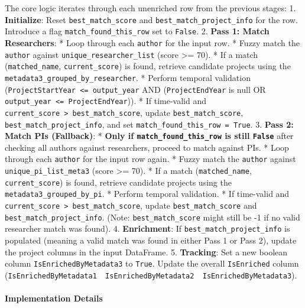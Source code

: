 \documentclass[12pt]{article}
\begin{document}
The core logic iterates through each unenriched row from the previous
stages: 1. \textbf{Initialize}: Reset \texttt{best\_match\_score} and
\texttt{best\_match\_project\_info} for the row. Introduce a flag
\texttt{match\_found\_this\_row} set to \texttt{False}. 2. \textbf{Pass
1: Match Researchers}: * Loop through each \texttt{author} for the input
row. * Fuzzy match the \texttt{author} against
\texttt{unique\_researcher\_list} (score \textgreater= 70). * If a match
(\texttt{matched\_name}, \texttt{current\_score}) is found, retrieve
candidate projects using the
\texttt{metadata3\_grouped\_by\_researcher}. * Perform temporal
validation (\texttt{ProjectStartYear\ \textless{}=\ output\_year} AND
(\texttt{ProjectEndYear} is null OR
\texttt{output\_year\ \textless{}=\ ProjectEndYear})). * If time-valid
and \texttt{current\_score\ \textgreater{}\ best\_match\_score}, update
\texttt{best\_match\_score}, \texttt{best\_match\_project\_info}, and
set \texttt{match\_found\_this\_row\ =\ True}. 3. \textbf{Pass 2: Match
PIs (Fallback)}: * \textbf{Only if \texttt{match\_found\_this\_row} is
still \texttt{False}} after checking all authors against researchers,
proceed to match against PIs. * Loop through each \texttt{author} for
the input row again. * Fuzzy match the \texttt{author} against
\texttt{unique\_pi\_list\_meta3} (score \textgreater= 70). * If a match
(\texttt{matched\_name}, \texttt{current\_score}) is found, retrieve
candidate projects using the \texttt{metadata3\_grouped\_by\_pi}. *
Perform temporal validation. * If time-valid and
\texttt{current\_score\ \textgreater{}\ best\_match\_score}, update
\texttt{best\_match\_score} and \texttt{best\_match\_project\_info}.
(Note: \texttt{best\_match\_score} might still be -1 if no valid
researcher match was found). 4. \textbf{Enrichment}: If
\texttt{best\_match\_project\_info} is populated (meaning a valid match
was found in either Pass 1 or Pass 2), update the project columns in the
input DataFrame. 5. \textbf{Tracking}: Set a new boolean column
\texttt{IsEnrichedByMetadata3} to \texttt{True}. Update the overall
\texttt{IsEnriched} column
(\texttt{IsEnrichedByMetadata1\ \textbar{}\ IsEnrichedByMetadata2\ \textbar{}\ IsEnrichedByMetadata3}).

\paragraph{Implementation
Details}\label{implementation-details-5}
\end{document}
